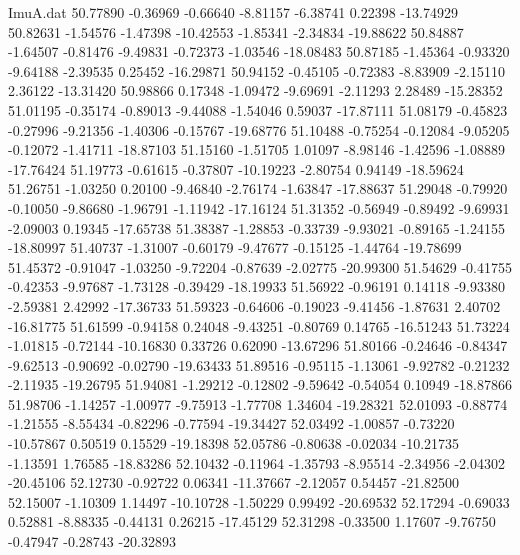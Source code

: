 \begin{filecontents}{ImuA.dat}
  50.77890   -0.36969   -0.66640   -8.81157   -6.38741    0.22398  -13.74929
  50.82631   -1.54576   -1.47398  -10.42553   -1.85341   -2.34834  -19.88622
  50.84887   -1.64507   -0.81476   -9.49831   -0.72373   -1.03546  -18.08483
  50.87185   -1.45364   -0.93320   -9.64188   -2.39535    0.25452  -16.29871
  50.94152   -0.45105   -0.72383   -8.83909   -2.15110    2.36122  -13.31420
  50.98866    0.17348   -1.09472   -9.69691   -2.11293    2.28489  -15.28352
  51.01195   -0.35174   -0.89013   -9.44088   -1.54046    0.59037  -17.87111
  51.08179   -0.45823   -0.27996   -9.21356   -1.40306   -0.15767  -19.68776
  51.10488   -0.75254   -0.12084   -9.05205   -0.12072   -1.41711  -18.87103
  51.15160   -1.51705    1.01097   -8.98146   -1.42596   -1.08889  -17.76424
  51.19773   -0.61615   -0.37807  -10.19223   -2.80754    0.94149  -18.59624
  51.26751   -1.03250    0.20100   -9.46840   -2.76174   -1.63847  -17.88637
  51.29048   -0.79920   -0.10050   -9.86680   -1.96791   -1.11942  -17.16124
  51.31352   -0.56949   -0.89492   -9.69931   -2.09003    0.19345  -17.65738
  51.38387   -1.28853   -0.33739   -9.93021   -0.89165   -1.24155  -18.80997
  51.40737   -1.31007   -0.60179   -9.47677   -0.15125   -1.44764  -19.78699
  51.45372   -0.91047   -1.03250   -9.72204   -0.87639   -2.02775  -20.99300
  51.54629   -0.41755   -0.42353   -9.97687   -1.73128   -0.39429  -18.19933
  51.56922   -0.96191    0.14118   -9.93380   -2.59381    2.42992  -17.36733
  51.59323   -0.64606   -0.19023   -9.41456   -1.87631    2.40702  -16.81775
  51.61599   -0.94158    0.24048   -9.43251   -0.80769    0.14765  -16.51243
  51.73224   -1.01815   -0.72144  -10.16830    0.33726    0.62090  -13.67296
  51.80166   -0.24646   -0.84347   -9.62513   -0.90692   -0.02790  -19.63433
  51.89516   -0.95115   -1.13061   -9.92782   -0.21232   -2.11935  -19.26795
  51.94081   -1.29212   -0.12802   -9.59642   -0.54054    0.10949  -18.87866
  51.98706   -1.14257   -1.00977   -9.75913   -1.77708    1.34604  -19.28321
  52.01093   -0.88774   -1.21555   -8.55434   -0.82296   -0.77594  -19.34427
  52.03492   -1.00857   -0.73220  -10.57867    0.50519    0.15529  -19.18398
  52.05786   -0.80638   -0.02034  -10.21735   -1.13591    1.76585  -18.83286
  52.10432   -0.11964   -1.35793   -8.95514   -2.34956   -2.04302  -20.45106
  52.12730   -0.92722    0.06341  -11.37667   -2.12057    0.54457  -21.82500
  52.15007   -1.10309    1.14497  -10.10728   -1.50229    0.99492  -20.69532
  52.17294   -0.69033    0.52881   -8.88335   -0.44131    0.26215  -17.45129
  52.31298   -0.33500    1.17607   -9.76750   -0.47947   -0.28743  -20.32893

\end{filecontents}
